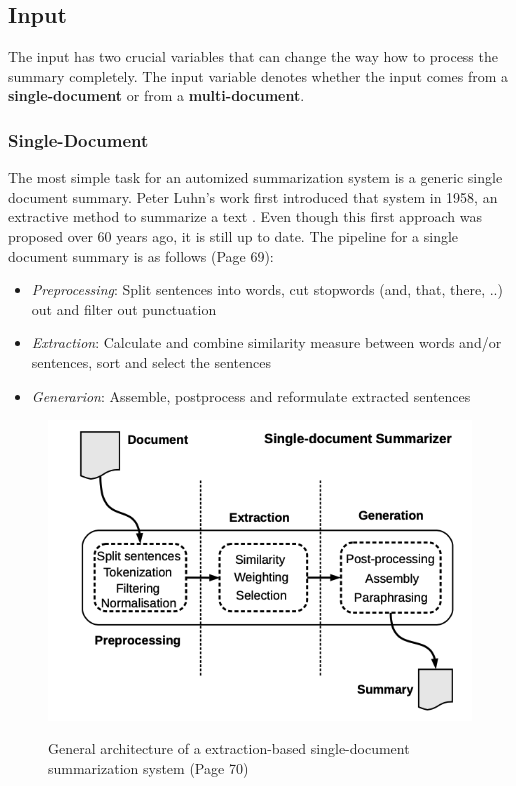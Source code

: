 \subsection{Input}\label{ss:input}

The input has two crucial variables that can change the way how to process the summary completely. The input variable denotes whether the input comes from a \textbf{single-document} or from a \textbf{multi-document}. 

\subsubsection{Single-Document}\label{ss:sd}
The most simple task for an automized summarization system is a generic single document summary. Peter Luhn's work first introduced that system in 1958, an extractive method to summarize a text \cite{textmining1958}.  Even though this first approach was proposed over 60 years ago, it is still up to date. The pipeline for a single document summary is as follows \cite{juan} (Page 69):

\begin{itemize}
	\item \textit{Preprocessing}: Split sentences into words, cut stopwords (and, that, there, ..) out and filter out punctuation 
	\item \textit{Extraction}: Calculate and combine similarity measure between words and/or sentences, sort and select the sentences
	\item \textit{Generarion}: Assemble, postprocess and reformulate extracted sentences
\end{itemize}

\begin{figure}
	\begin{center}
		\includegraphics[width=4.5in]{photos/single_doc}\\
		\caption{General architecture of a extraction-based single-document summarization system \cite{juan} (Page 70)}\label{single}
	\end{center}
\end{figure}

